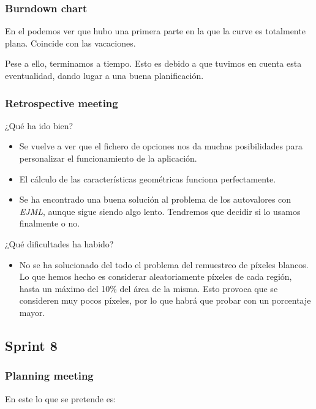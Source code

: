 \subsubsection*{Burndown chart}
En el \burndownchart{}  podemos ver que hubo una primera parte en la que la curve es totalmente plana. Coincide con las vacaciones.


Pese a ello, terminamos a tiempo. Esto es debido a que tuvimos en cuenta esta eventualidad, dando lugar a una buena planificación.


\subsubsection*{Retrospective meeting}
¿Qué ha ido bien?
\begin{itemize}
 \item Se vuelve a ver que el fichero de opciones nos da muchas posibilidades para personalizar el funcionamiento de la aplicación.
 \item El cálculo de las características geométricas funciona perfectamente.
 \item Se ha encontrado una buena solución al problema de los autovalores con \textit{EJML}, aunque sigue siendo algo lento. Tendremos que decidir si lo usamos finalmente o no.
\end{itemize}

¿Qué dificultades ha habido?
\begin{itemize}
 \item No se ha solucionado del todo el problema del remuestreo de píxeles blancos. Lo que hemos hecho es considerar aleatoriamente píxeles de cada región, hasta un máximo del 10\% del área de la misma. Esto provoca que se consideren muy pocos píxeles, por lo que habrá que probar con un porcentaje mayor.
\end{itemize}


\subsection{Sprint 8}
\subsubsection*{Planning meeting}
En este \sprint{} lo que se pretende es:

